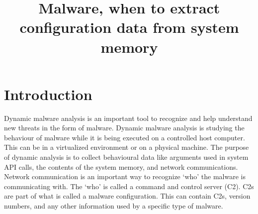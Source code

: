 \documentclass[conference]{IEEEtran}
\begin{document}
\title{Malware, when to extract configuration data from system memory}


\author{
\and
{}
}



\maketitle






%
\IEEEpeerreviewmaketitle


\section{Introduction}
Dynamic malware analysis is an important tool to recognize and help understand new threats in the form of malware. 
Dynamic malware analysis is studying the behaviour of malware while it is being executed on a controlled host computer. This can be in a virtualized environment or on a physical machine. The purpose of dynamic analysis is to collect behavioural data like arguments used in system API calls, the contents of the system memory, and network communications. Network communication is an important way to recognize ‘who’ the malware is communicating with. The ‘who’ is called a command and control server (C2). C2s are part of what is called a malware configuration. This can contain C2s, version numbers, and any other information used by a specific type of malware.\\
\end{document}
